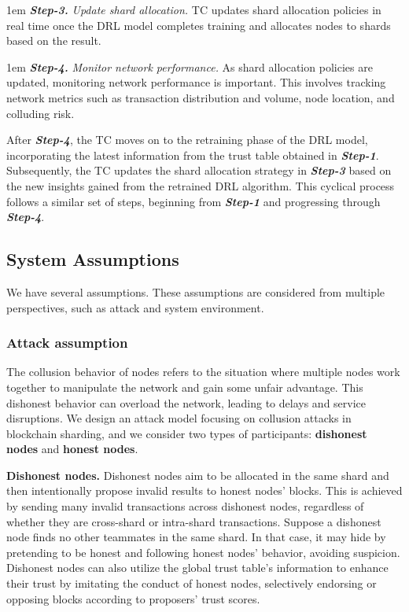 \noindent\hangindent 1em  \textbf{\textit{Step-3.}}
\noindent\textit{Update shard allocation.} TC updates shard allocation policies in real time once the DRL model completes training and allocates nodes to shards based on the result. 

\noindent\hangindent 1em  \textbf{\textit{Step-4.}}
\noindent\textit{Monitor network performance.} As shard allocation policies are updated, monitoring network performance is important. This involves tracking network metrics such as transaction distribution and volume, node location, and colluding risk.

\noindent After \textbf{\textit{Step-4}}, the TC moves on to the retraining phase of the DRL model, incorporating the latest information from the trust table obtained in \textbf{\textit{Step-1}}. Subsequently, the TC updates the shard allocation strategy in \textbf{\textit{Step-3}} based on the new insights gained from the retrained DRL algorithm. This cyclical process follows a similar set of steps, beginning from \textbf{\textit{Step-1}} and progressing through \textbf{\textit{Step-4}}.


\subsection{System Assumptions}
We have several assumptions. These assumptions are considered from multiple perspectives, such as attack and system environment. 

\subsubsection{Attack assumption}
The collusion behavior of nodes refers to the situation where multiple nodes work together to manipulate the network and gain some unfair advantage. This dishonest behavior can overload the network, leading to delays and service disruptions. We design an attack model focusing on collusion attacks in blockchain sharding, and we consider two types of participants: \textbf{dishonest nodes} and \textbf{honest nodes}. 



\smallskip
\noindent\textbf{Dishonest nodes.}
Dishonest nodes aim to be allocated in the same shard and then intentionally propose invalid results to honest nodes' blocks. This is achieved by sending many invalid transactions across dishonest nodes, regardless of whether they are cross-shard or intra-shard transactions. Suppose a dishonest node finds no other teammates in the same shard. In that case, it may hide by pretending to be honest and following honest nodes' behavior, avoiding suspicion. Dishonest nodes can also utilize the global trust table's information to enhance their trust by imitating the conduct of honest nodes, selectively endorsing or opposing blocks according to proposers' trust scores. 


